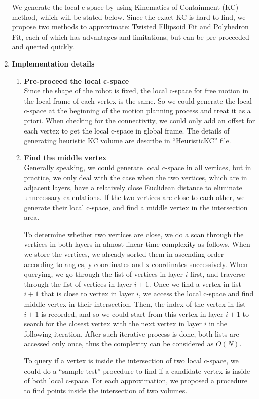 \documentclass{article}
\begin{document}
\begin{enumerate}
We generate the local c-space by using Kinematics of Containment (KC) method, which will be stated below. Since the exact KC is hard to find, we propose two methods to approximate: Twisted Ellipsoid Fit and Polyhedron Fit, each of which has advantages and limitations, but can be pre-proceeded and queried quickly.

\item {\bf Implementation details}\\
\begin{enumerate}
\item {\bf Pre-proceed the local c-space}\\
Since the shape of the robot is fixed, the local c-space for free motion in the local frame of each vertex is the same. So we could generate the local c-space at the beginning of the motion planning process and treat it as a priori. When checking for the connectivity, we could only add an offset for each vertex to get the local c-space in global frame. The details of generating heuristic KC volume are describe in ``HeuristicKC'' file.

\item {\bf Find the middle vertex}\\
Generally speaking, we could generate local c-space in all vertices, but in practice, we only deal with the case when the two vertices, which are in adjacent layers, have a relatively close Euclidean distance to eliminate unnecessary calculations. If the two vertices are close to each other, we generate their local c-space, and find a middle vertex in the intersection area. 

To determine whether two vertices are close, we do a scan through the vertices in both layers in almost linear time complexity as follows. When we store the vertices, we already sorted them in ascending order according to angles, y coordinates and x coordinates successively. When querying, we go through the list of vertices in layer $i$ first, and traverse through the list of vertices in layer $i+1$. Once we find a vertex in list $i+1$ that is close to vertex in layer $i$, we access the local c-space and find middle vertex in their intersection. Then, the index of the vertex in list $i+1$ is recorded, and so we could start from this vertex in layer $i+1$ to search for the closest vertex with the next vertex in layer $i$ in the following iteration. After such iterative process is done, both lists are accessed only once, thus the complexity can be considered as $O(N)$.

To query if a vertex is inside the intersection of two local c-space, we could do a ``sample-test'' procedure to find if a candidate vertex is inside of both local c-space. For each approximation, we proposed a procedure to find points inside the intersection of two volumes.


\end{enumerate}
\end{enumerate}
\end{document}
